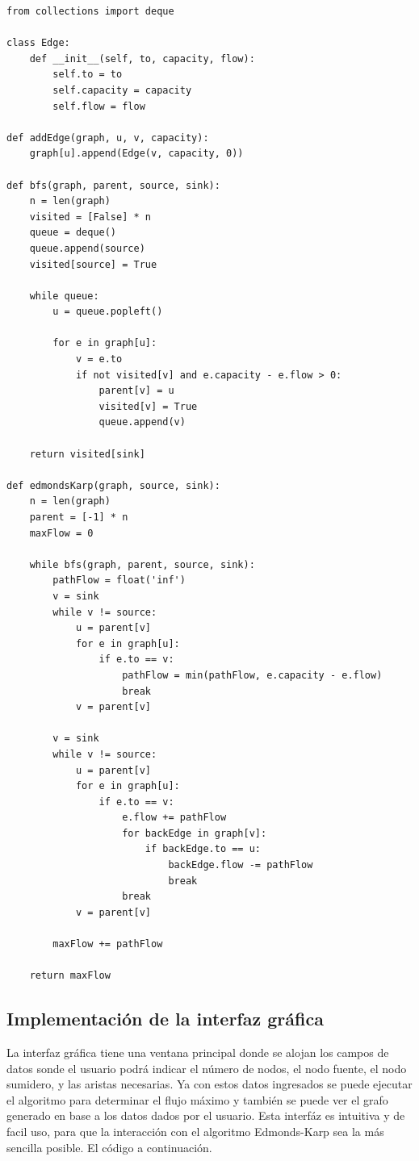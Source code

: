 \documentclass[a4paper]{article}
\begin{document}
\begin{lstlisting}[style=mystyle, caption={Código de Python para el algoritmo de Edmonds-Karp}, label={lst:edmonds-karp}]
from collections import deque

class Edge:
    def __init__(self, to, capacity, flow):
        self.to = to
        self.capacity = capacity
        self.flow = flow

def addEdge(graph, u, v, capacity):
    graph[u].append(Edge(v, capacity, 0))

def bfs(graph, parent, source, sink):
    n = len(graph)
    visited = [False] * n
    queue = deque()
    queue.append(source)
    visited[source] = True

    while queue:
        u = queue.popleft()

        for e in graph[u]:
            v = e.to
            if not visited[v] and e.capacity - e.flow > 0:
                parent[v] = u
                visited[v] = True
                queue.append(v)

    return visited[sink]

def edmondsKarp(graph, source, sink):
    n = len(graph)
    parent = [-1] * n
    maxFlow = 0

    while bfs(graph, parent, source, sink):
        pathFlow = float('inf')
        v = sink
        while v != source:
            u = parent[v]
            for e in graph[u]:
                if e.to == v:
                    pathFlow = min(pathFlow, e.capacity - e.flow)
                    break
            v = parent[v]

        v = sink
        while v != source:
            u = parent[v]
            for e in graph[u]:
                if e.to == v:
                    e.flow += pathFlow
                    for backEdge in graph[v]:
                        if backEdge.to == u:
                            backEdge.flow -= pathFlow
                            break
                    break
            v = parent[v]

        maxFlow += pathFlow

    return maxFlow

\end{lstlisting}
\subsection{Implementación de la interfaz gráfica}
La interfaz gráfica tiene una ventana principal donde se alojan los campos de datos sonde el usuario podrá indicar el número de nodos, el nodo fuente, el nodo sumidero, y las aristas necesarias. Ya con estos datos ingresados se puede ejecutar el algoritmo para determinar el flujo máximo y también se puede ver el grafo generado en base a los datos dados por el usuario.
Esta interfáz es intuitiva y de facil uso, para que la interacción con el algoritmo Edmonds-Karp sea la más sencilla posible. El código a continuación.
\end{document}
